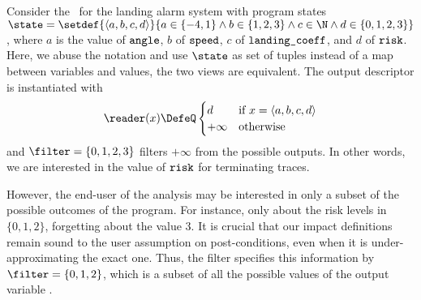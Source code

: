 \begin{example}
  Consider the~ for the landing alarm system with program states $\state=\setdef{\langle a, b, c, d \rangle}{a\in\{-4,1\}\land b\in\{1,2,3\}\land c\in\N \land d\in\{0,1,2,3\}}$, where $a$ is the value of $\texttt{angle}$, $b$ of $\texttt{speed}$, $c$ of $\texttt{landing\_coeff}$, and $d$ of $\texttt{risk}$.
  Here, we abuse the notation and use $\state$ as set of tuples instead of a map between variables and values, the two views are equivalent.
  The output descriptor is instantiated with
  \[
  \reader(x) \DefeQ \begin{cases}
    d & \text{if } x = \langle a, b, c, d \rangle \\
    +\infty & \text{otherwise}
  \end{cases}
  \]
  and $\filter=\{0,1,2,3\}$ filters $+\infty$ from the possible outputs.
  In other words, we are interested in the value of $\texttt{risk}$ for terminating traces.

  However, the end-user of the analysis may be interested in only a subset of the possible outcomes of the program.
  For instance, only about the risk levels in $\{0, 1, 2\}$, forgetting about the value $3$.
  It is crucial that our impact definitions remain sound to the user assumption on post-conditions, even when it is under-approximating the exact one.
  Thus, the filter specifies this information by $\filter=\{0, 1, 2\}$, which is a subset of all the possible values of the output variable \z.
\end{example}




